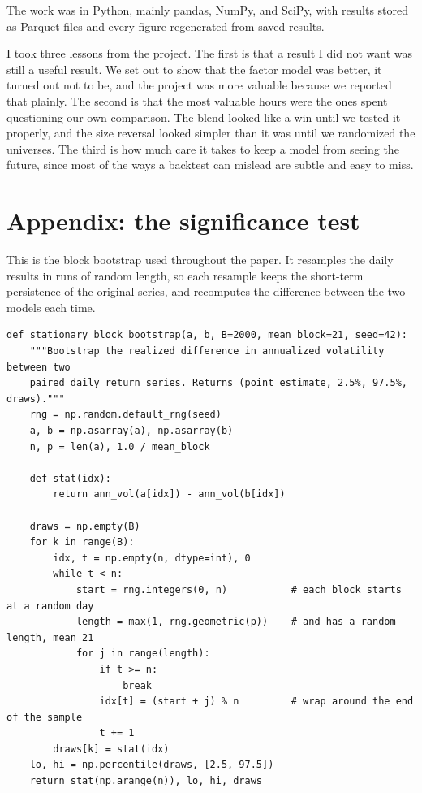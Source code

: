 \documentclass[11pt,letterpaper]{article}
\begin{document}
The work was in Python, mainly pandas, NumPy, and SciPy, with results stored as Parquet
files and every figure regenerated from saved results.

I took three lessons from the project. The first is that a result I did not want was still
a useful result. We set out to show that the factor model was better, it turned out not to
be, and the project was more valuable because we reported that plainly. The second is that
the most valuable hours were the ones spent questioning our own comparison. The blend looked
like a win until we tested it properly, and the size reversal looked simpler than it was
until we randomized the universes. The third is how much care it takes to keep a model from
seeing the future, since most of the ways a backtest can mislead are subtle and easy to
miss.

\clearpage
\appendix
\section{Appendix: the significance test}

This is the block bootstrap used throughout the paper. It resamples the daily results in runs of random
length, so each resample keeps the short-term persistence of the original series, and
recomputes the difference between the two models each time.

\begin{lstlisting}
def stationary_block_bootstrap(a, b, B=2000, mean_block=21, seed=42):
    """Bootstrap the realized difference in annualized volatility between two
    paired daily return series. Returns (point estimate, 2.5%, 97.5%, draws)."""
    rng = np.random.default_rng(seed)
    a, b = np.asarray(a), np.asarray(b)
    n, p = len(a), 1.0 / mean_block

    def stat(idx):
        return ann_vol(a[idx]) - ann_vol(b[idx])

    draws = np.empty(B)
    for k in range(B):
        idx, t = np.empty(n, dtype=int), 0
        while t < n:
            start = rng.integers(0, n)           # each block starts at a random day
            length = max(1, rng.geometric(p))    # and has a random length, mean 21
            for j in range(length):
                if t >= n:
                    break
                idx[t] = (start + j) % n         # wrap around the end of the sample
                t += 1
        draws[k] = stat(idx)
    lo, hi = np.percentile(draws, [2.5, 97.5])
    return stat(np.arange(n)), lo, hi, draws
\end{lstlisting}
\end{document}
